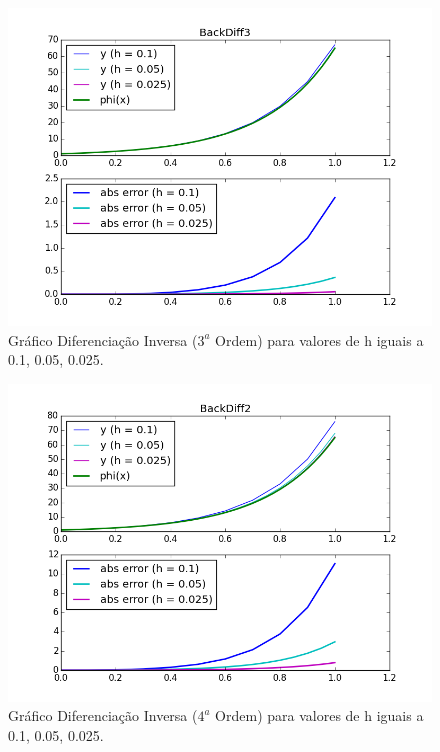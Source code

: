 \documentclass[a4paper]{article}
\begin{document}
\begin{figure}[b]
\centering
\includegraphics[width=1.0\textwidth]{plots/BackDiff3.png}
\caption{\label{fig:backdiff3}Gráfico Diferenciação Inversa ($3^a$ Ordem) para valores de h iguais a 0.1, 0.05, 0.025.}
\end{figure}

\begin{figure}[b]
\centering
\includegraphics[width=1.0\textwidth]{plots/BackDiff2.png}
\caption{\label{fig:backdiff4}Gráfico Diferenciação Inversa ($4^a$ Ordem) para valores de h iguais a 0.1, 0.05, 0.025.}
\end{figure}

\pagebreak
\end{document}
